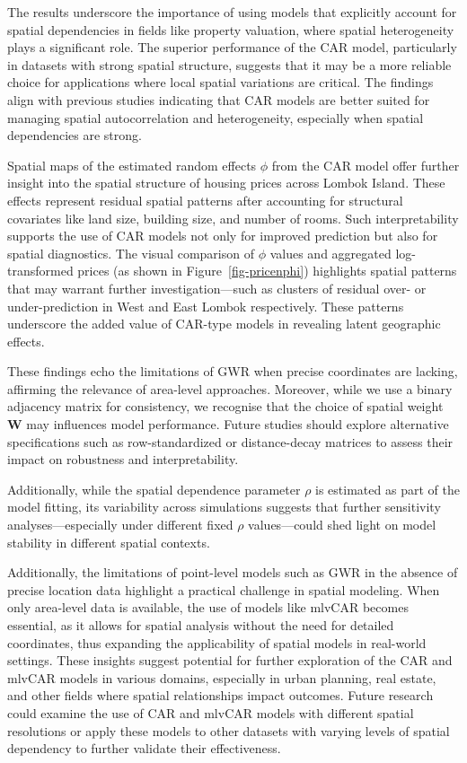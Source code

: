 \documentclass[
  default,
]{sn-jnl}
\begin{document}
The results underscore the importance of using models that explicitly
account for spatial dependencies in fields like property valuation,
where spatial heterogeneity plays a significant role. The superior
performance of the CAR model, particularly in datasets with strong
spatial structure, suggests that it may be a more reliable choice for
applications where local spatial variations are critical. The findings
align with previous studies indicating that CAR models are better suited
for managing spatial autocorrelation and heterogeneity, especially when
spatial dependencies are strong.

Spatial maps of the estimated random effects \(\phi\) from the CAR model
offer further insight into the spatial structure of housing prices
across Lombok Island. These effects represent residual spatial patterns
after accounting for structural covariates like land size, building
size, and number of rooms. Such interpretability supports the use of CAR
models not only for improved prediction but also for spatial
diagnostics. The visual comparison of \(\phi\) values and aggregated
log-transformed prices (as shown in Figure~\ref{fig-pricenphi})
highlights spatial patterns that may warrant further
investigation---such as clusters of residual over- or under-prediction
in West and East Lombok respectively. These patterns underscore the
added value of CAR-type models in revealing latent geographic effects.

These findings echo the limitations of GWR when precise coordinates are
lacking, affirming the relevance of area-level approaches. Moreover,
while we use a binary adjacency matrix for consistency, we recognise
that the choice of spatial weight \(\mathbf{W}\) may influences model
performance. Future studies should explore alternative specifications
such as row-standardized or distance-decay matrices to assess their
impact on robustness and interpretability.

Additionally, while the spatial dependence parameter \(\rho\) is
estimated as part of the model fitting, its variability across
simulations suggests that further sensitivity analyses---especially
under different fixed \(\rho\) values---could shed light on model
stability in different spatial contexts.

Additionally, the limitations of point-level models such as GWR in the
absence of precise location data highlight a practical challenge in
spatial modeling. When only area-level data is available, the use of
models like mlvCAR becomes essential, as it allows for spatial analysis
without the need for detailed coordinates, thus expanding the
applicability of spatial models in real-world settings. These insights
suggest potential for further exploration of the CAR and mlvCAR models
in various domains, especially in urban planning, real estate, and other
fields where spatial relationships impact outcomes. Future research
could examine the use of CAR and mlvCAR models with different spatial
resolutions or apply these models to other datasets with varying levels
of spatial dependency to further validate their effectiveness.
\end{document}
